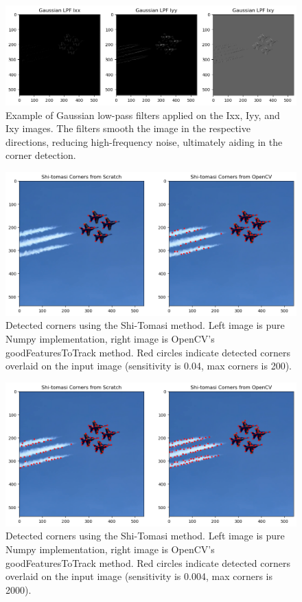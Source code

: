 \documentclass[11pt, conference, letterpaper]{IEEEtran}
\begin{document}
\begin{figure}[t]
    \centering
    \includegraphics[width=0.95\linewidth]{images/gaussian_low_pass_filters.png}
    \caption{Example of Gaussian low-pass filters applied on the Ixx, Iyy, and Ixy images. The filters smooth the image in the respective directions, reducing high-frequency noise, ultimately aiding in the corner detection.}
    \label{fig:gaussian_lpf}
\end{figure}

\begin{figure}[h]
    \centering
    \includegraphics[width=0.95\linewidth]{images/shi_tomasi_corners.png}
    \caption{Detected corners using the Shi-Tomasi method. Left image is pure Numpy implementation, right image is OpenCV's goodFeaturesToTrack method. Red circles indicate detected corners overlaid on the input image (sensitivity is 0.04, max corners is 200).}
    \label{fig:shi_tomasi_results}
\end{figure}

\begin{figure}[h]
    \centering
    \includegraphics[width=0.95\linewidth]{images/shi_tomasi_corners_2.png}
    \caption{Detected corners using the Shi-Tomasi method. Left image is pure Numpy implementation, right image is OpenCV's goodFeaturesToTrack method. Red circles indicate detected corners overlaid on the input image (sensitivity is 0.004, max corners is 2000).}
    \label{fig:shi_tomasi_results2}
\end{figure}
\twocolumn
\end{document}
